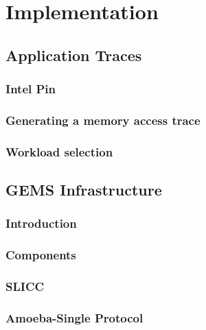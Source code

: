 
%
%

\chapter{Implementation}
\label{four}

\section{Application Traces}
\subsection{Intel Pin}
\subsection{Generating a memory access trace}
\subsection{Workload selection}
\section{GEMS Infrastructure}
\subsection{Introduction}
\subsection{Components}
\subsection{SLICC}
\subsection{Amoeba-Single Protocol}
